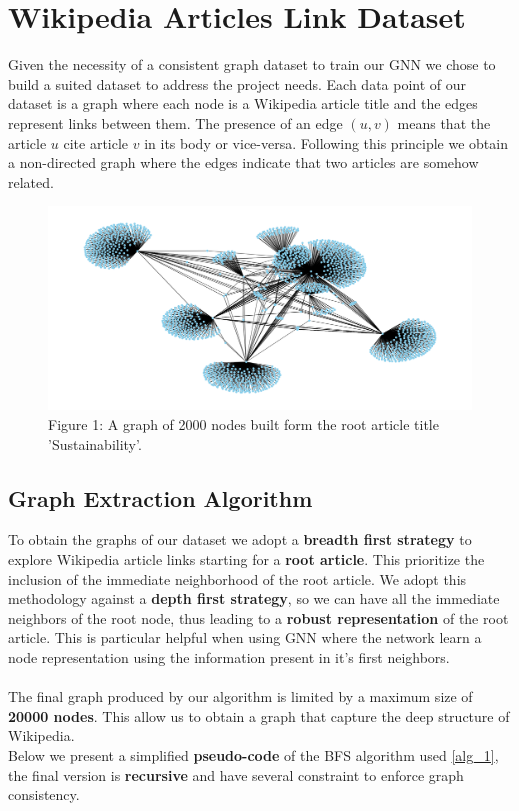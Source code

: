 \documentclass[11pt]{article}
\begin{document}
	\section{Wikipedia Articles Link Dataset}
	Given the necessity of a consistent graph dataset to train our GNN we chose to build a suited dataset to address the project needs.
	Each data point of our dataset is a graph where each node is a Wikipedia article title and the edges represent links between them. The presence of an edge $(u, v)$ means that the article $u$ cite article $v$ in its body or vice-versa.
	Following this principle we obtain a non-directed graph where the edges indicate that two articles are somehow related.
	\begin{figure}[h] %
		\centering
		\includegraphics[width=1\textwidth]{images/wiki_link_grap_2k.png}
		\caption{Figure 1: A graph of 2000 nodes built form the root article title 'Sustainability'.}
	\end{figure}
	
	\subsection{Graph Extraction Algorithm}
	To obtain the graphs of our dataset we adopt a \textbf{breadth first strategy} to explore Wikipedia article links starting for a \textbf{root article}. This prioritize the inclusion of the immediate neighborhood of the root article.
	We adopt this methodology against a \textbf{depth first strategy}, so we can have all the immediate neighbors of the root node, thus leading to a \textbf{robust representation} of the root article.
	This is particular helpful when using GNN where the network learn a node representation using the information present in it's first neighbors.\\\\
	The final graph produced by our algorithm is limited by a maximum size of \textbf{20000 nodes}. This allow us to obtain a graph that capture the deep structure of Wikipedia. \\
	Below we present a simplified \textbf{pseudo-code} of the BFS algorithm used \ref{alg_1}, the final version is \textbf{recursive} and have several constraint to enforce graph consistency. 
	
\end{document}
